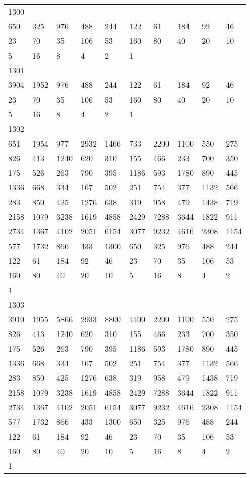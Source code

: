 \begin{longtable}{*{10}{l}}
1300&&&&&&&&&\\
650& 325& 976& 488& 244& 122& 61& 184& 92& 46\\
23& 70& 35& 106& 53& 160& 80& 40& 20& 10\\
5& 16& 8& 4& 2& 1& \\

1301&&&&&&&&&\\
3904& 1952& 976& 488& 244& 122& 61& 184& 92& 46\\
23& 70& 35& 106& 53& 160& 80& 40& 20& 10\\
5& 16& 8& 4& 2& 1& \\

1302&&&&&&&&&\\
651& 1954& 977& 2932& 1466& 733& 2200& 1100& 550& 275\\
826& 413& 1240& 620& 310& 155& 466& 233& 700& 350\\
175& 526& 263& 790& 395& 1186& 593& 1780& 890& 445\\
1336& 668& 334& 167& 502& 251& 754& 377& 1132& 566\\
283& 850& 425& 1276& 638& 319& 958& 479& 1438& 719\\
2158& 1079& 3238& 1619& 4858& 2429& 7288& 3644& 1822& 911\\
2734& 1367& 4102& 2051& 6154& 3077& 9232& 4616& 2308& 1154\\
577& 1732& 866& 433& 1300& 650& 325& 976& 488& 244\\
122& 61& 184& 92& 46& 23& 70& 35& 106& 53\\
160& 80& 40& 20& 10& 5& 16& 8& 4& 2\\
1& \\

1303&&&&&&&&&\\
3910& 1955& 5866& 2933& 8800& 4400& 2200& 1100& 550& 275\\
826& 413& 1240& 620& 310& 155& 466& 233& 700& 350\\
175& 526& 263& 790& 395& 1186& 593& 1780& 890& 445\\
1336& 668& 334& 167& 502& 251& 754& 377& 1132& 566\\
283& 850& 425& 1276& 638& 319& 958& 479& 1438& 719\\
2158& 1079& 3238& 1619& 4858& 2429& 7288& 3644& 1822& 911\\
2734& 1367& 4102& 2051& 6154& 3077& 9232& 4616& 2308& 1154\\
577& 1732& 866& 433& 1300& 650& 325& 976& 488& 244\\
122& 61& 184& 92& 46& 23& 70& 35& 106& 53\\
160& 80& 40& 20& 10& 5& 16& 8& 4& 2\\
1& \\


\end{longtable}
